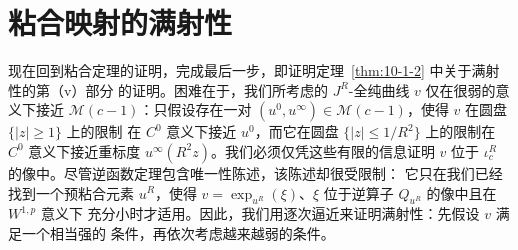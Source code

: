 
\section{粘合映射的满射性}\label{sec:10-7}

现在回到粘合定理的证明，完成最后一步，即证明定理~\ref{thm:10-1-2}
中关于满射性的第（v）部分
的证明。困难在于，我们所考虑的 $J^R$-全纯曲线 $v$ 仅在很弱的意义下接近
$\mathcal M(c-1)$：只假设存在一对
$(u^0,u^\infty)\in\mathcal M(c-1)$，使得 $v$ 在圆盘 $\{|z|\geq1\}$ 上的限制
在 $C^0$ 意义下接近 $u^0$，而它在圆盘 $\{|z|\leq1/R^2\}$ 上的限制在
$C^0$ 意义下接近重标度 $u^\infty(R^2z)$。我们必须仅凭这些有限的信息证明
$v$ 位于 $\iota_c^R$ 的像中。尽管逆函数定理包含唯一性陈述，该陈述却很受限制：
它只在我们已经找到一个预粘合元素 $u^R$，使得
$v=\exp_{u^R}(\xi)$、$\xi$ 位于逆算子 $Q_{u^R}$ 的像中且在 $W^{1,p}$ 意义下
充分小时才适用。因此，我们用逐次逼近来证明满射性：先假设 $v$ 满足一个相当强的
条件，再依次考虑越来越弱的条件。

